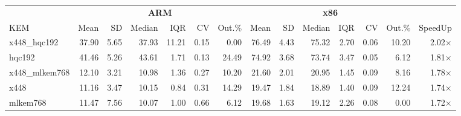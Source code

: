 \begin{table}[!ht]
\centering
\begin{tabular}{l|rrrrrr|rrrrrr|r}
\toprule
& \multicolumn{6}{c}{\bfseries ARM} & \multicolumn{6}{c}{\bfseries x86} & \\
\cmidrule(lr){2-7} \cmidrule(lr){8-13}
KEM & Mean & SD & Median & IQR & CV & Out.\% & Mean & SD & Median & IQR & CV & Out.\% & SpeedUp \\
\midrule
x448_hqc192 & 37.90 & 5.65 & 37.93 & 11.21 & 0.15 & 0.00 & 76.49 & 4.43 & 75.32 & 2.70 & 0.06 & 10.20 & 2.02× \\
hqc192 & 41.46 & 5.26 & 43.61 & 1.71 & 0.13 & 24.49 & 74.92 & 3.68 & 73.74 & 3.47 & 0.05 & 6.12 & 1.81× \\
x448_mlkem768 & 12.10 & 3.21 & 10.98 & 1.36 & 0.27 & 10.20 & 21.60 & 2.01 & 20.95 & 1.45 & 0.09 & 8.16 & 1.78× \\
x448 & 11.16 & 3.47 & 10.15 & 0.84 & 0.31 & 14.29 & 19.47 & 1.84 & 18.89 & 1.40 & 0.09 & 12.24 & 1.74× \\
mlkem768 & 11.47 & 7.56 & 10.07 & 1.00 & 0.66 & 6.12 & 19.68 & 1.63 & 19.12 & 2.26 & 0.08 & 0.00 & 1.72× \\
\bottomrule
\end{tabular}
\end{table}
